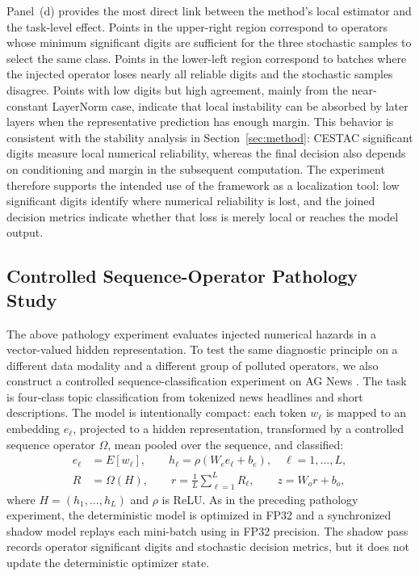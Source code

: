 \documentclass[manuscript, screen]{acmart}
\newcommand{\xyy}[1]{{\color{black}{#1}}}
\begin{document}
Panel~(d) provides the most direct link between the method's local estimator
and the task-level effect. Points in the upper-right region correspond to
operators whose minimum significant digits are sufficient for the three
stochastic samples to select the same class. Points in the lower-left region
correspond to batches where the injected operator loses nearly all reliable
digits and the stochastic samples disagree. Points with low digits but high
agreement, mainly from the near-constant LayerNorm case, indicate that local
instability can be absorbed by later layers when the representative prediction
has enough margin. This behavior is consistent with the stability analysis in
Section~\ref{sec:method}: CESTAC significant digits measure local numerical
reliability, whereas the final decision also depends on conditioning and
margin in the subsequent computation. The experiment therefore supports the
intended use of the framework as a localization tool: low significant digits
identify where numerical reliability is lost, and the joined decision metrics
indicate whether that loss is merely local or reaches the model output.


\subsection{Controlled Sequence-Operator Pathology Study}
\label{sec:exp-controlled-sequence-pathology}

The above pathology experiment evaluates injected numerical hazards in
a vector-valued hidden representation. To test the same diagnostic principle
on a different data modality and a different group of polluted operators, we
also construct a controlled sequence-classification experiment on AG News \citep{zhang2015character}. The
task is four-class topic classification from tokenized news headlines and
short descriptions. The model is intentionally compact: each token
$w_{\ell}$ is mapped to an embedding $e_{\ell}$, projected to a hidden
representation, transformed by a controlled sequence operator $\Omega$, mean
pooled over the sequence, and classified:
\begin{align}
e_{\ell} &= E[w_{\ell}], \qquad
h_{\ell} = \rho(W_e e_{\ell}+b_e), \quad \ell=1,\ldots,L,
\label{eq:agnews-token-hidden}\\
R &= \Omega(H), \qquad
r = \frac{1}{L}\sum_{\ell=1}^{L} R_{\ell}, \qquad
z = W_o r+b_o,
\label{eq:agnews-sequence-classifier}
\end{align}
where $H=(h_1,\ldots,h_L)$ and $\rho$ is ReLU. As in the preceding
pathology experiment, the deterministic model is optimized in FP32 and a
synchronized shadow model replays each mini-batch using \xyy{the CESTAC-style arithmetic-level mode} in FP32 precision. The shadow pass records
operator significant digits and stochastic decision metrics, but it does not
update the deterministic optimizer state.
\end{document}
